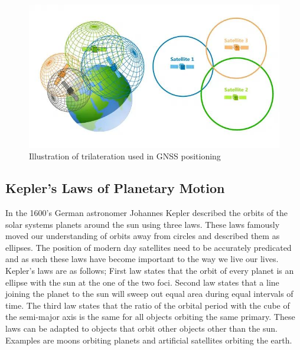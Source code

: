 \begin{figure}[h]
    \begin{centering}
        \includegraphics[width=14cm,keepaspectratio]{Figures/trilateration.png}
        \caption{Illustration of trilateration used in GNSS positioning}
        \label{fig:trilateration}
    \end{centering}
\end{figure}

\subsection{Kepler's Laws of Planetary Motion} \label{subsec: OrbitalMechanics}
In the 1600's German astronomer Johannes Kepler described the orbits of the solar systems planets around the sun using three laws. 
These laws famously moved our understanding of orbits away from circles and described them as ellipses. The position of modern day satellites need to be accurately
predicated and as such these laws have become important to the way we live our lives. Kepler's laws are as follows; First law states that the orbit of every planet is an
ellipse with the sun at the one of the two foci. Second law states that a line joining the planet to the sun will sweep out equal area during equal intervals of time.
The third law states that the ratio of the orbital period with the cube of the semi-major axis is the same for all objects orbiting the same primary. These laws can be
adapted to objects that orbit other objects other than the sun. Examples are moons orbiting planets and artificial satellites orbiting the earth.

